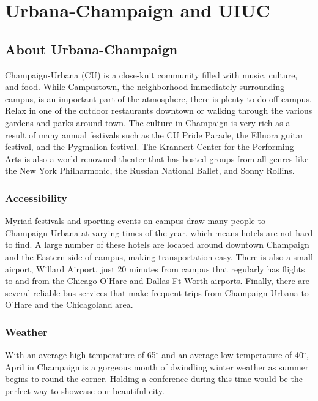 \section{Urbana-Champaign and UIUC}

\subsection{About Urbana-Champaign}
Champaign-Urbana (CU) is a close-knit community filled with music, culture, and food. While Campustown, the neighborhood immediately surrounding campus,  is an important part of the atmosphere, there is plenty to do off campus. Relax in one of the outdoor restaurants downtown or walking through the various gardens and parks around town. The culture in Champaign is very rich as a result of many annual festivals such as the CU Pride Parade, the Ellnora guitar festival, and the Pygmalion festival. The Krannert Center for the Performing Arts is also a world-renowned theater that has hosted groups from all genres like the New York Philharmonic, the Russian National Ballet, and Sonny Rollins.

\subsubsection{Accessibility}
Myriad festivals and sporting events on campus draw many people to Champaign-Urbana at varying times of the year, which means hotels are not hard to find. A large number of these hotels are located around downtown Champaign and the Eastern side of campus, making transportation easy. There is also a small airport, Willard Airport, just 20 minutes from campus that regularly has flights to and from the Chicago O’Hare and Dallas Ft Worth airports. Finally, there are several reliable bus services that make frequent trips from Champaign-Urbana to O’Hare and the Chicagoland area.

\subsubsection{Weather}
With an average high temperature of 65$^{\circ}$ and an average low temperature of 40$^{\circ}$, April in Champaign is a gorgeous month of dwindling winter weather as summer begins to round the corner. Holding a conference during this time would be the perfect way to showcase our beautiful city.

